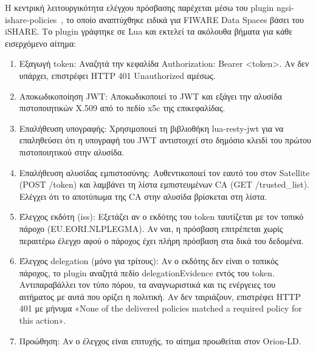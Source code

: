 Η κεντρική λειτουργικότητα ελέγχου πρόσβασης παρέχεται μέσω του
\textlatin{plugin} \textlatin{ngsi-ishare-policies}~\cite{kong-ngsi-plugin2023},
το οποίο αναπτύχθηκε ειδικά για \textlatin{FIWARE Data Spaces} βάσει του
\textlatin{iSHARE}. Το \textlatin{plugin} γράφτηκε σε \textlatin{Lua}
και εκτελεί τα ακόλουθα βήματα για κάθε εισερχόμενο αίτημα:

\begin{enumerate}
    \item Εξαγωγή \textlatin{token}: Αναζητά την κεφαλίδα
    \textlatin{Authorization: Bearer <token>}. Αν δεν υπάρχει, επιστρέφει
    \textlatin{HTTP 401 Unauthorized} αμέσως.

    \item Αποκωδικοποίηση \textlatin{JWT}: Αποκωδικοποιεί
    το \textlatin{JWT} και εξάγει την αλυσίδα πιστοποιητικών
    \textlatin{X.509} από το πεδίο \textlatin{x5c} της επικεφαλίδας.

    \item Επαλήθευση υπογραφής: Χρησιμοποιεί τη βιβλιοθήκη
    \textlatin{lua-resty-jwt} για να επαληθεύσει ότι η υπογραφή του
    \textlatin{JWT} αντιστοιχεί στο δημόσιο κλειδί του πρώτου
    πιστοποιητικού στην αλυσίδα.

    \item Επαλήθευση αλυσίδας εμπιστοσύνης: Αυθεντικοποιεί
    τον εαυτό του στον \textlatin{Satellite} (\textlatin{POST /token})
    και λαμβάνει τη λίστα εμπιστευμένων \textlatin{CA}
    (\textlatin{GET /trusted\_list}). Ελέγχει ότι το αποτύπωμα της
    \textlatin{CA} στην αλυσίδα βρίσκεται στη λίστα.

    \item Έλεγχος εκδότη (\textlatin{iss}): Εξετάζει αν ο
    εκδότης του \textlatin{token} ταυτίζεται με τον τοπικό πάροχο
    (\textlatin{EU.EORI.NLPLEGMA}). Αν ναι, η πρόσβαση επιτρέπεται
    χωρίς περαιτέρω έλεγχο αφού ο πάροχος έχει πλήρη πρόσβαση στα
    δικά του δεδομένα.

    \item Έλεγχος \textlatin{delegation} (μόνο για τρίτους):
    Αν ο εκδότης δεν είναι ο τοπικός πάροχος, το \textlatin{plugin}
    αναζητά πεδίο \textlatin{delegationEvidence} εντός του
    \textlatin{token}. Αντιπαραβάλλει τον τύπο πόρου, τα
    αναγνωριστικά και τις ενέργειες του αιτήματος με αυτά που
    ορίζει η πολιτική. Αν δεν ταιριάζουν, επιστρέφει
    \textlatin{HTTP 401} με μήνυμα
    \textlatin{«None of the delivered policies matched a required
    policy for this action»}.

    \item Προώθηση: Αν ο έλεγχος είναι επιτυχής, το
    αίτημα προωθείται στον \textlatin{Orion-LD}.
\end{enumerate}

